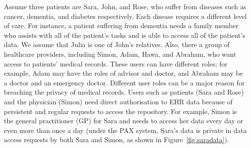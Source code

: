 \documentclass[journal,article,submit,moreauthors,pdftex]{Definitions/mdpi}
\begin{document}
Assume three patients are Sara, John, and Rose, who suffer from diseases such as 
cancer, dementia, and diabetes respectively. Each disease requires a different level 
of care. For instance, a patient suffering from dementia needs a family member who assists with all of the patient's tasks and is able to access all of the patient's data. We assume that Julia is one of John's relatives. Also, there a group of healthcare providers, including Simon, Adam, Hawa, and Abraham, who want access to patients' medical records. These users can have different roles; for example, Adam may have the roles of advisor and doctor, and Abraham may be a doctor and an emergency doctor. Different user roles can be a major reason for breaching the privacy of medical records. Users such as patients (Sara and Rose) and the physician (Simon) need direct authorisation to EHR data because of persistent and regular requests to access the repository. For example, Simon is the general practitioner (GP) for Sara and needs to access her data every day or even more than once a day (under the PAX system, Sara's data is private in data access requests by both Sara and Simon, as shown in Figure~\ref{fig:saradata}).
\end{document}
